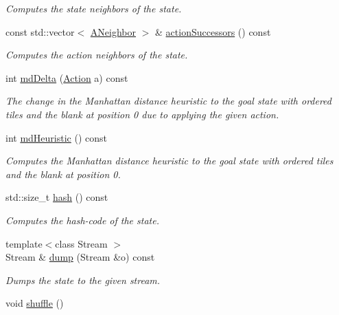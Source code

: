 \begin{DoxyCompactItemize}
\begin{DoxyCompactList}\small\item\em Computes the state neighbors of the state. \end{DoxyCompactList}\item 
const std\+::vector$<$ \hyperlink{structslb_1_1ext_1_1domain_1_1sliding__tile_1_1SlidingTile_ad70d129acaffb4db0b286870379cd047}{A\+Neighbor} $>$ \& \hyperlink{structslb_1_1ext_1_1domain_1_1sliding__tile_1_1SlidingTile_a77c7892e08ca211dd2685180422720aa}{action\+Successors} () const 
\begin{DoxyCompactList}\small\item\em Computes the action neighbors of the state. \end{DoxyCompactList}\item 
int \hyperlink{structslb_1_1ext_1_1domain_1_1sliding__tile_1_1SlidingTile_a1a215f7010b62fc1b0574f84ac72c090}{md\+Delta} (\hyperlink{structslb_1_1ext_1_1domain_1_1sliding__tile_1_1SlidingTile_af40ada89a9d6c41d673e1330f0849ed4}{Action} a) const 
\begin{DoxyCompactList}\small\item\em The change in the Manhattan distance heuristic to the goal state with ordered tiles and the blank at position 0 due to applying the given action. \end{DoxyCompactList}\item 
int \hyperlink{structslb_1_1ext_1_1domain_1_1sliding__tile_1_1SlidingTile_a5e79fb57ec6ad7a8548e2fd5da247992}{md\+Heuristic} () const 
\begin{DoxyCompactList}\small\item\em Computes the Manhattan distance heuristic to the goal state with ordered tiles and the blank at position 0. \end{DoxyCompactList}\item 
std\+::size\+\_\+t \hyperlink{structslb_1_1ext_1_1domain_1_1sliding__tile_1_1SlidingTile_a0f6270eb674ca8167a06692f6408a799}{hash} () const 
\begin{DoxyCompactList}\small\item\em Computes the hash-\/code of the state. \end{DoxyCompactList}\item 
{\footnotesize template$<$class Stream $>$ }\\Stream \& \hyperlink{structslb_1_1ext_1_1domain_1_1sliding__tile_1_1SlidingTile_aa65c672fdd8d540dd1858ba29ee69049}{dump} (Stream \&o) const 
\begin{DoxyCompactList}\small\item\em Dumps the state to the given stream. \end{DoxyCompactList}\item 
void \hyperlink{structslb_1_1ext_1_1domain_1_1sliding__tile_1_1SlidingTile_a776502ccb13c8304917d186857afa054}{shuffle} ()\hypertarget{structslb_1_1ext_1_1domain_1_1sliding__tile_1_1SlidingTile_a776502ccb13c8304917d186857afa054}{}\label{structslb_1_1ext_1_1domain_1_1sliding__tile_1_1SlidingTile_a776502ccb13c8304917d186857afa054}


\end{DoxyCompactItemize}
